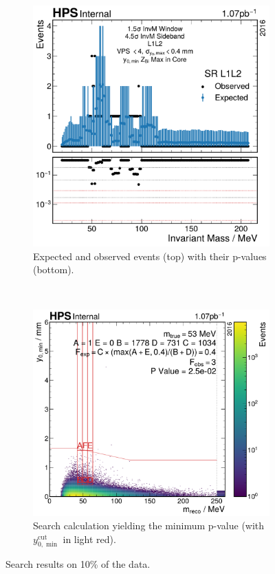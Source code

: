 \begin{figure}
  \centering
  \begin{subfigure}{0.48\textwidth}
    \includegraphics[width=\textwidth]{figures/hps/analysis/results/search.pdf}
    \caption{Expected and observed events (top) with their p-values (bottom).}
    \label{fig:search:all}
  \end{subfigure}
  ~
  \begin{subfigure}{0.48\textwidth}
    \includegraphics[width=\textwidth]{figures/hps/analysis/results/search-min-p-val.pdf}
    \caption{Search calculation yielding the minimum p-value
    (with $y_{0,\min}^\mathrm{cut}$ in light red).}
    \label{fig:search:min-p-val}
  \end{subfigure}
  \caption{Search results on 10\% of the data.}
  \label{fig:search}
\end{figure}

